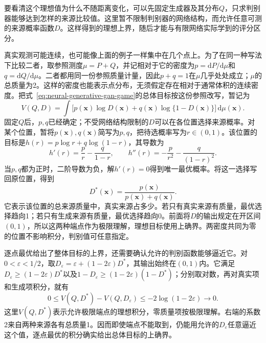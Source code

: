 要看清这个理想值为什么不随距离变化，可以先固定生成器及其分布$Q$，只求判别器能够达到怎样的来源比较值。这里暂不限制判别器的网络结构，而允许任意可测的来源概率函数$D$。这样得到的理想上界，随后才能与有限网络实际学到的评分区分。

真实观测可能连续，也可能像上面的例子一样集中在几个点上。为了在同一种写法下比较二者，取参照测度$\mu=P+Q$，并记相对于它的密度为$p=\mathrm{d}P/\mathrm{d}\mu$和$q=\mathrm{d}Q/\mathrm{d}\mu$。二者都用同一份参照质量计量，因此$p+q=1$在$\mu$几乎处处成立；$\mu$的总质量为2。这样的密度也能表示点分布，无须假定存在相对于通常体积的连续密度。把式~\eqref{eq:neural-generative-gan-game}的总体目标按这份参照改写，暂记为
\begin{equation}
  \label{eq:neural-generative-gan-density-objective}
  V(Q,D)=\int\bigl[p(\bm{x})\log D(\bm{x})
      +q(\bm{x})\log\{1-D(\bm{x})\}\bigr]\,\mathrm{d}\mu(\bm{x}).
\end{equation}
固定$Q$后，$p,q$已经确定；不受网络结构限制的$D$可以在各位置选择来源概率。对某个位置，暂将$p(\bm{x}),q(\bm{x})$简写为$p,q$，把待选概率写为$r\in(0,1)$。该位置的目标是$h(r)=p\log r+q\log(1-r)$，其导数为
\[
  h'(r)=\frac{p}{r}-\frac{q}{1-r},\qquad
  h''(r)=-\frac{p}{r^2}-\frac{q}{(1-r)^2}.
\]
当$p,q$都为正时，二阶导数为负，解$h'(r)=0$得到唯一最优概率。将这一选择写回原位置，得到
\begin{equation}
  \label{eq:neural-generative-gan-optimal-discriminator}
  D^*(\bm{x})=\frac{p(\bm{x})}{p(\bm{x})+q(\bm{x})}.
\end{equation}
它表示该位置的总来源质量中，真实来源占多少。若只有真实来源有质量，最优选择趋向1；若只有生成来源有质量，最优选择趋向0。前面将$D$的输出规定在开区间$(0,1)$，所以这两种端点作为极限理解，理想目标使用上确界。两密度共同为零的位置不影响积分，判别值可任意指定。

逐点最优给出了整体目标的上界，还需要确认允许的判别函数能够逼近它。对$0<\varepsilon<1/2$，取$D_{\varepsilon}=\varepsilon+(1-2\varepsilon)D^*$，其输出始终在$(0,1)$内。它满足$D_{\varepsilon}\geq(1-2\varepsilon)D^*$以及$1-D_{\varepsilon}\geq(1-2\varepsilon)(1-D^*)$；分别取对数，再对真实项和生成项积分，就有
\[
  0\leq V(Q,D^*)-V(Q,D_{\varepsilon})
       \leq-2\log(1-2\varepsilon)\longrightarrow0.
\]
这里$V(Q,D^*)$表示允许极限端点的理想积分，零质量项按极限理解。右端的系数2来自两种来源各有总质量1。因而即使端点不能取到，仍能用允许的$D_{\varepsilon}$任意逼近这个值，逐点最优的积分确实给出总体目标的上确界。


